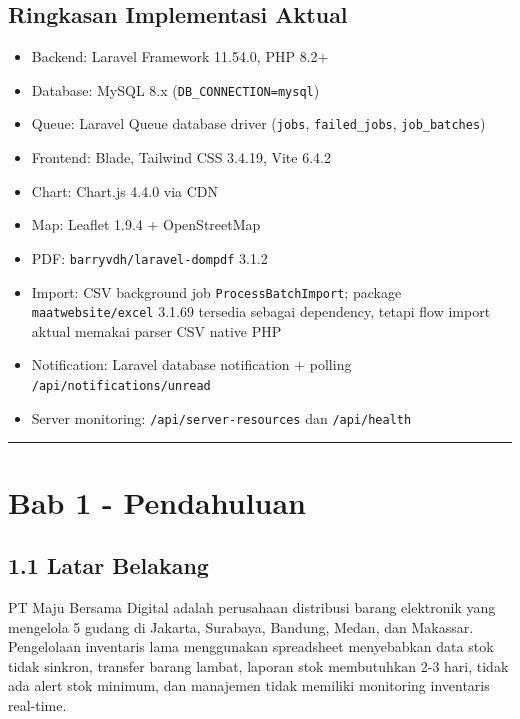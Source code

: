 \documentclass[
]{article}
\begin{document}
\subsection{Ringkasan Implementasi
Aktual}\label{ringkasan-implementasi-aktual}

\begin{itemize}
\item Backend: Laravel Framework 11.54.0, PHP 8.2+
\item Database: MySQL 8.x (\texttt{DB\_CONNECTION=mysql})
\item Queue: Laravel Queue database driver (\texttt{jobs},
  \texttt{failed\_jobs}, \texttt{job\_batches})
\item Frontend: Blade, Tailwind CSS 3.4.19, Vite 6.4.2
\item Chart: Chart.js 4.4.0 via CDN
\item Map: Leaflet 1.9.4 + OpenStreetMap
\item PDF: \texttt{barryvdh/laravel-dompdf} 3.1.2
\item Import: CSV background job \texttt{ProcessBatchImport}; package
  \texttt{maatwebsite/excel} 3.1.69 tersedia sebagai dependency, tetapi flow
  import aktual memakai parser CSV native PHP
\item Notification: Laravel database notification + polling
  \texttt{/api/notifications/unread}
\item Server monitoring: \texttt{/api/server-resources} dan
  \texttt{/api/health}
\end{itemize}

\begin{center}\rule{0.5\linewidth}{0.5pt}\end{center}

\section{Bab 1 - Pendahuluan}\label{bab-1---pendahuluan}

\subsection{1.1 Latar Belakang}\label{11-latar-belakang}

PT Maju Bersama Digital adalah perusahaan distribusi barang elektronik
yang mengelola 5 gudang di Jakarta, Surabaya, Bandung, Medan, dan
Makassar. Pengelolaan inventaris lama menggunakan spreadsheet
menyebabkan data stok tidak sinkron, transfer barang lambat, laporan
stok membutuhkan 2-3 hari, tidak ada alert stok minimum, dan manajemen
tidak memiliki monitoring inventaris real-time.
\end{document}
